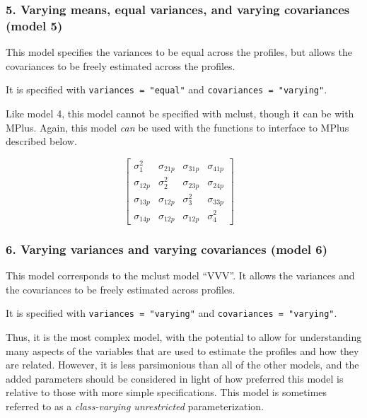 \documentclass[man]{apa6}
\begin{document}
\hypertarget{varying-means-equal-variances-and-varying-covariances-model-5}{%
\subsubsection{5. Varying means, equal variances, and varying covariances (model 5)}\label{varying-means-equal-variances-and-varying-covariances-model-5}}

This model specifies the variances to be equal across the profiles, but allows the covariances to be freely estimated across the profiles.

It is specified with \texttt{variances\ =\ "equal"} and \texttt{covariances\ =\ "varying"}.

Like model 4, this model cannot be specified with mclust, though it can be with MPlus. Again, this model \emph{can} be used with the functions to interface to MPlus described below.

\[
\left[ \begin{matrix} { \sigma  }_{ 1 }^{ 2 } & { \sigma  }_{ 21p } & { \sigma  }_{ 31p } & { \sigma  }_{ 41p } \\ { \sigma  }_{ 12p } & { \sigma  }_{ 2 }^{ 2 } & { \sigma  }_{ 23p } & { \sigma  }_{ 24p } \\ { \sigma  }_{ 13p } & { \sigma  }_{ 12p } & { \sigma  }_{ 3 }^{ 2 } & { \sigma  }_{ 33p } \\ { \sigma  }_{ 14p } & { \sigma  }_{ 12p } & { \sigma  }_{ 12p } & { \sigma  }_{ 4 }^{ 2 } \end{matrix} \right] \quad 
\]

\hypertarget{varying-variances-and-varying-covariances-model-6}{%
\subsubsection{6. Varying variances and varying covariances (model 6)}\label{varying-variances-and-varying-covariances-model-6}}

This model corresponds to the mclust model \enquote{VVV}. It allows the variances and the covariances to be freely estimated across profiles.

It is specified with \texttt{variances\ =\ "varying"} and \texttt{covariances\ =\ "varying"}.

Thus, it is the most complex model, with the potential to allow for understanding many aspects of the variables that are used to estimate the profiles and how they are related. However, it is less parsimonious than all of the other models, and the added parameters should be considered in light of how preferred this model is relative to those with more simple specifications. This model is sometimes referred to as a \emph{class-varying unrestricted} parameterization.
\end{document}
